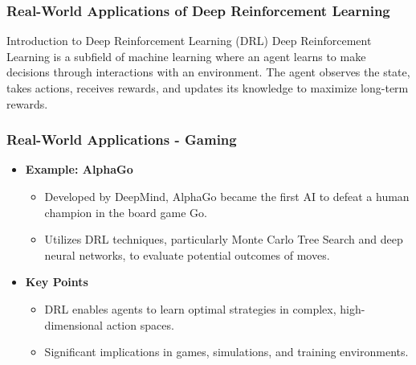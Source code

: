 \documentclass[aspectratio=169]{beamer}
\begin{document}
\begin{frame}[fragile]
    \frametitle{Real-World Applications of Deep Reinforcement Learning}
    \begin{block}{Introduction to Deep Reinforcement Learning (DRL)}
        Deep Reinforcement Learning is a subfield of machine learning where an agent learns to make decisions through interactions with an environment. The agent observes the state, takes actions, receives rewards, and updates its knowledge to maximize long-term rewards.
    \end{block}
\end{frame}

\begin{frame}[fragile]
    \frametitle{Real-World Applications - Gaming}
    \begin{itemize}
        \item \textbf{Example: AlphaGo}
            \begin{itemize}
                \item Developed by DeepMind, AlphaGo became the first AI to defeat a human champion in the board game Go.
                \item Utilizes DRL techniques, particularly Monte Carlo Tree Search and deep neural networks, to evaluate potential outcomes of moves.
            \end{itemize}
        \item \textbf{Key Points}
            \begin{itemize}
                \item DRL enables agents to learn optimal strategies in complex, high-dimensional action spaces.
                \item Significant implications in games, simulations, and training environments.
            \end{itemize}
    \end{itemize}
\end{frame}
\end{document}
